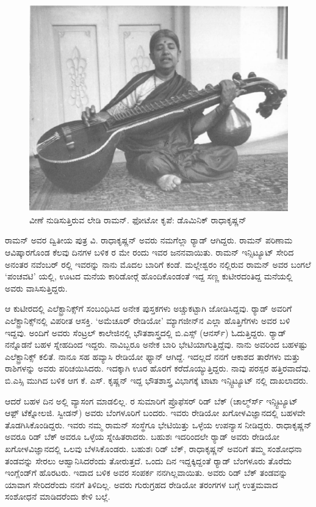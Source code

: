 \begin{figure}[!htpb]
\centering
\includegraphics[scale=0.21]{"images/16.jpg"}
\caption{ವೀಣೆ ನುಡಿಸುತ್ತಿರುವ ಲೇಡಿ ರಾಮನ್. ಫೋಟೋ ಕೃಪೆ: ಡೊಮಿನಿಕ್ ರಾಧಾಕೃಷ್ಣನ್}\label{chap5-fig02}
\end{figure}



ರಾಮನ್ ಅವರ ದ್ವಿತೀಯ ಪುತ್ರ ವಿ. ರಾಧಾಕೃಷ್ಣನ್ ಅವರು ನಮಗೆಲ್ಲಾ ರ‍್ಯಾಡ್ ಆಗಿದ್ದರು. ರಾಮನ್ ಪರಿಣಾಮ ಆವಿಷ್ಕಾರಗೊಂಡ ಕೆಲವು ದಿನಗಳ ಬಳಿಕ ರ ಮೇ  ರಂದು ಇವರ ಜನನವಾಯಿತು. ರಾಮನ್ ಇನ್ಸಿಟ್ಯೂಟ್ ಸೇರಿದ ಅನಂತರ ನವೆಂಬರ್ ರಲ್ಲಿ ಇವರನ್ನು ನಾನು ಮೊದಲ ಬಾರಿಗೆ ಕಂಡೆ. ಮಲ್ಲೇಶ್ವರಂ ನಲ್ಲಿರುವ ರಾಮನ್ ಅವರ ಬಂಗಲೆ ‘ಪಂಚವಟಿ’ ಯಲ್ಲಿ, ಊಟದ ಮನೆಯ ಕಾರಿಡೋರ್‍ಗೆ ಹೊಂದಿಕೊಂಡಂತೆ ಇದ್ದ ಸಣ್ಣ ಕುಟೀರದಂತಿದ್ದ ಮನೆಯಲ್ಲಿ ಅವರು ವಾಸಿಸುತ್ತಿದ್ದರು.

ಆ ಕುಟೀರದಲ್ಲಿ ಎಲೆಕ್ಟ್ರಾನಿಕ್ಸ್‌ಗೆ ಸಂಬಂಧಿಸಿದ ಅನೇಕ ಪುಸ್ತಕಗಳು ಅಚ್ಚುಕಟ್ಟಾಗಿ ಜೋಡಿಸಿದ್ದವು. ರ‍್ಯಾಡ್ ಅವರಿಗೆ ಎಲೆಕ್ಟ್ರಾನಿಕ್ಸ್‌ನಲ್ಲಿ ವಿಪರೀತ ಆಸಕ್ತಿ. ‘ಅಮೆಚೂರ್ ರೇಡಿಯೋ’ ಮ್ಯಾಗಜೀನ್‌ನ ಎಲ್ಲಾ ಹೊತ್ತಿಗೆಗಳು ಅವರ ಬಳಿ ಇದ್ದವು. ಅಂದಿಗೆ ಅವರು ಸೆಂಟ್ರಲ್ ಕಾಲೇಜಿನಲ್ಲಿ ಭೌತಶಾಸ್ತ್ರದಲ್ಲಿ ಬಿ.ಎಸ್ಸ್ (ಆನರ್ಸ್) ಓದುತ್ತಿದ್ದರು. ರ‍್ಯಾಡ್ ನನ್ನೊಡನೆ ಬಹಳ ಸ್ನೇಹದಿಂದ ಇದ್ದರು. ನಾವಿಬ್ಬರೂ ಅನೇಕ ಬಾರಿ ಭೇಟಿಯಾಗುತ್ತಿದ್ದೆವು. ನಾನು ಅವರಿಂದ ಬಹಳಷ್ಟು ಎಲೆಕ್ಟ್ರಾನಿಕ್ಸ್ ಕಲಿತೆ. ನಾನೂ ಸಹ ಹವ್ಯಾಸಿ ರೇಡಿಯೋ ಫ್ಯಾನ್ ಆಗಿದ್ದೆ. ಇದಲ್ಲದೆ ನನಗೆ ಆಕಾಶದ ತಾರೆಗಳು ಮತ್ತು ರಾಶಿಗಳನ್ನು ಅವರು ಪರಿಚಯಿಸಿದರು. ಇದಕ್ಕಾಗಿ ಊರ ಹೊರಗೆ ಕರೆದೊಯ್ಯುತ್ತಿದ್ದರು. ನಾವು ಪರಸ್ಪರ ಹತ್ತಿರವಾದೆವು. ಬಿ.ಎಸ್ಸಿ ಮುಗಿದ ಬಳಿಕ ಆಗ ಕೆ. ಎಸ್. ಕೃಷ್ಣನ್ ಇದ್ದ ಭೌತಶಾಸ್ತ್ರ ವಿಭಾಗಕ್ಕೆ ಟಾಟಾ ಇನ್ಸ್ಟಿಟ್ಯೂಟ್ ನಲ್ಲಿ ದಾಖಲಾದರು.

ಆದರೆ ಬಹಳ ದಿನ ಅಲ್ಲಿ ವ್ಯಾಸಂಗ ಮಾಡಲಿಲ್ಲ. ರ ಸುಮಾರಿಗೆ ಪ್ರೊಫೆಸರ್ ರಿಡ್ ಬೆಕ್ (ಚಾಲ್ಮ್‌ರ್ಸ್ ಇನ್ಸ್ಟಿಟ್ಯೂಟ್ ಆಫ಼್ ಟೆಕ್ನೋಲಜಿ. ಸ್ವೀಡನ್) ಅವರು ಬೆಂಗಳೂರಿಗೆ ಬಂದರು. ಇವರು ರೇಡಿಯೋ ಖಗೋಳವಿಜ್ಞಾನದಲ್ಲಿ ಬಹಳವೇ ತೊಡಗಿಸಿಕೊಂಡಿದ್ದರು. ಇವರು ನಮ್ಮ ರಾಮನ್ ಸಂಸ್ಥೆಗೂ ಭೇಟಿಯಿತ್ತು ಒಳ್ಳೆಯ ಉಪನ್ಯಾಸ ನೀಡಿದ್ದರು. ರಾಧಾಕೃಷ್ಣನ್ ಅವರೂ ರಿಡ್ ಬೆಕ್ ಅವರೂ ಒಳ್ಳೆಯ ಸ್ನೇಹಿತರಾದರು. ಬಹುಶಃ ಇದರಿಂದಲೇ ರ‍್ಯಾಡ್ ಅವರು ರೇಡಿಯೋ ಖಗೋಳವಿಜ್ಞಾನದಲ್ಲಿ ಒಲವು ಬೆಳಸಿಕೊಂಡರು. ಬಹುಶಃ ರಿಡ್ ಬೆಕ್, ರಾಧಾಕೃಷ್ಣನ್ ಅವರಿಗೆ ತಮ್ಮ ಸಂಶೋಧನಾ ತಂಡವನ್ನು ಸೇರಲು ಆಹ್ವಾನಿಸಿದರೆಂದು ತೋರುತ್ತದೆ. ಒಂದು ದಿನ ಇದ್ದಕ್ಕಿದ್ದಂತೆ ರ‍್ಯಾಡ್ ಬೆಂಗಳೂರು ತೊರೆದು ಇಂಗ್ಲೆಂಡ್‍ಗೆ ಹೊರಟರು. ಇದಾದ ಬಳಿಕ ಅವರ ಸಂಪರ್ಕ ನನಗಿಲ್ಲವಾಯಿತು. ಅವರು ರಿಡ್ ಬೆಕ್ ತಂಡವನ್ನು ಯಾವಾಗ ಸೇರಿದರೆಂದು ನನಗೆ ತಿಳಿದಿಲ್ಲ. ಅವರು ಗುರುಗ್ರಹದ ರೇಡಿಯೋ ತರಂಗಗಳ ಬಗ್ಗೆ ಉತ್ತಮವಾದ ಸಂಶೋಧನೆ ಮಾಡಿದರೆಂದು ಕೇಳಿ ಬಲ್ಲೆ.


